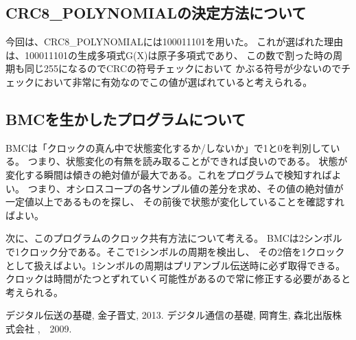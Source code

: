 \documentclass[11pt,a4j]{jsarticle}
\begin{document}
\subsection{CRC8\_POLYNOMIALの決定方法について}
\label{sub:CRC8}


今回は、CRC8\_POLYNOMIALには100011101を用いた。
これが選ばれた理由は、100011101の生成多項式G(X)は原子多項式であり、
この数で割った時の周期も同じ255になるのでCRCの符号チェックにおいて
かぶる符号が少ないのでチェックにおいて非常に有効なのでこの値が選ばれていると考えられる。

\subsection{BMCを生かしたプログラムについて}
\label{sub:BMCを生かしたプログラムについて}

BMC゙は「クロックの真ん中で状態変化するか/しないか」で1と0を判別している。
つまり、状態変化の有無を読み取ることができれば良いのである。
状態が変化する瞬間は傾きの絶対値が最大である。これをプログラムで検知すればよい。
つまり、オシロスコープの各サンプル値の差分を求め、その値の絶対値が一定値以上であるものを探し、
その前後で状態が変化していることを確認すればよい。

次に、このプログラムのクロック共有方法について考える。
BMCは2シンボルで1クロック分である。そこで1シンボルの周期を検出し、
その2倍を1クロックとして扱えばよい。1シンボルの周期はプリアンブル伝送時に必ず取得できる。
クロックは時間がたつとずれていく可能性があるので常に修正する必要があると考えられる。







\begin{thebibliography}{99} %
   デジタル伝送の基礎, 金子晋丈, 2013.
   デジタル通信の基礎, 岡育生, 森北出版株式会社 ,　2009.
\end{thebibliography}
\end{document}
